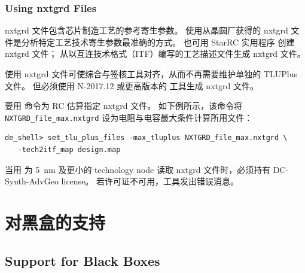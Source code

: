 \subsubsection*{Using nxtgrd Files}

nxtgrd 文件包含芯片制造工艺的参考寄生参数。
使用从晶圆厂获得的 nxtgrd 文件是分析特定工艺技术寄生参数最准确的方式。
也可用 StarRC 实用程序  创建 nxtgrd 文件； 从以互连技术格式（ITF）编写的工艺描述文件生成 nxtgrd 文件。

\begin{noteBox}
使用 nxtgrd 文件可使综合与签核工具对齐，从而不再需要维护单独的 TLUPlus 文件。
但必须使用 N-2017.12 或更高版本的  工具生成 nxtgrd 文件。
\end{noteBox}

要用  命令为 RC 估算指定 nxtgrd 文件。
如下例所示，该命令将 \texttt{NXTGRD\_file\_max.nxtgrd} 设为电阻与电容最大条件计算所用文件：
\begin{lstlisting}
de_shell> set_tlu_plus_files -max_tluplus NXTGRD_file_max.nxtgrd \
   -tech2itf_map design.map
\end{lstlisting}

当用  为 5~nm 及更小的 technology node 读取 nxtgrd 文件时，必须持有 DC-Synth-AdvGeo license。
若许可证不可用，工具发出错误消息。

\section{对黑盒的支持}
\subsection*{Support for Black Boxes}

